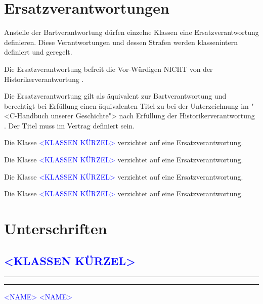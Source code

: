 \documentclass[fontsize=12pt,parskip=half]{scrartcl}
\begin{document}
\section{Ersatzverantwortungen}
\begin{contract}
  \Clause[title={Ersatzverantwortung}]\label{ersatz}
  Anstelle der Bartverantwortung dürfen einzelne Klassen eine Ersatzverantwortung definieren. Diese Verantwortungen und dessen Strafen werden klassenintern
  definiert und geregelt.

  Die Ersatzverantwortung befreit die Vor-Würdigen NICHT von der Historikerverantwortung .

  Die Ersatzverantwortung gilt als äquivalent zur Bartverantwortung und berechtigt bei Erfüllung einen äquivalenten Titel zu  bei der Unterzeichnung
  im "<C-Handbuch unserer Geschichte"> nach Erfüllung der Historikerverantwortung . Der Titel muss im Vertrag definiert sein.

  \parnumberfalse
  [\textcolor{blue}{
      DIESEN ABSATZ löschen beim editiern.
      Für Beispiele von ERSATZVERANTWORUNGEN siehe Vertrag von 2025 in aktuller Form und im Git-History \\
      zB Hash 70387592b18fcf31c9a02d59568b21b290b9a0e1}]
  \parnumbertrue

  \Clause[title={Klasse \textcolor{blue}{<KLASSEN KÜRZEL>}}]
  Die Klasse \textcolor{blue}{<KLASSEN KÜRZEL>} verzichtet auf eine Ersatzverantwortung.

  \Clause[title={Klasse \textcolor{blue}{<KLASSEN KÜRZEL>}}]
  Die Klasse \textcolor{blue}{<KLASSEN KÜRZEL>} verzichtet auf eine Ersatzverantwortung.

  \Clause[title={Klasse \textcolor{blue}{<KLASSEN KÜRZEL>}}]
  Die Klasse \textcolor{blue}{<KLASSEN KÜRZEL>} verzichtet auf eine Ersatzverantwortung.

  \Clause[title={Klasse \textcolor{blue}{<KLASSEN KÜRZEL>}}]
  Die Klasse \textcolor{blue}{<KLASSEN KÜRZEL>} verzichtet auf eine Ersatzverantwortung.
\end{contract}


\pagebreak
\section{Unterschriften}

\subsection*{\textcolor{blue}{<KLASSEN KÜRZEL>}}
\vspace{50pt}
\noindent\rule{7cm}{.4pt}\hfill\rule{7cm}{.4pt}\par
\noindent \textcolor{blue}{<NAME>} \hfill\textcolor{blue}{<NAME>}
\end{document}
